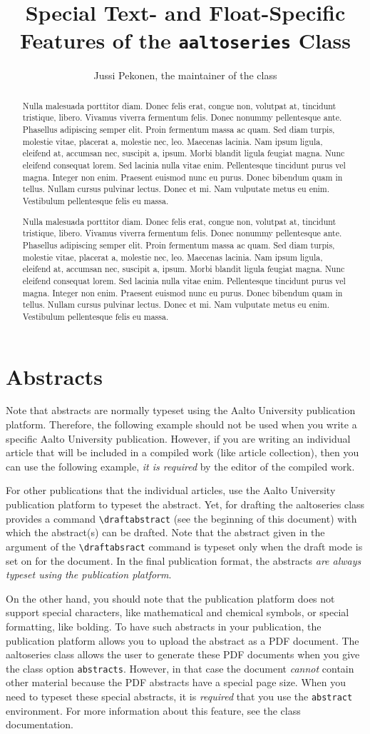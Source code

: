 \documentclass[draft*,nochapters]{aaltoseries}
\author{Jussi Pekonen, the maintainer of the class}
\title{Special Text- and Float-Specific Features of the \texttt{aaltoseries} Class}
\newcommand{\lipsum}{%
Nulla malesuada porttitor diam. Donec felis erat, congue non, volutpat at, tincidunt tristique, libero. Vivamus viverra fermentum felis. Donec nonummy pellentesque ante. Phasellus adipiscing semper elit. Proin fermentum massa ac quam. Sed diam turpis, molestie vitae, placerat a, molestie nec, leo. Maecenas lacinia. Nam ipsum ligula, eleifend at, accumsan nec, suscipit a, ipsum. Morbi blandit ligula feugiat magna. Nunc eleifend consequat lorem. Sed lacinia nulla vitae enim. Pellentesque tincidunt purus vel magna. Integer non enim. Praesent euismod nunc eu purus. Donec bibendum quam in tellus. Nullam cursus pulvinar lectus. Donec et mi. Nam vulputate metus eu enim. Vestibulum pellentesque felis eu massa.
}
\begin{document}

\tableofcontents

\clearpage

\section{Abstracts}

Note that abstracts are normally typeset using the Aalto University publication platform. Therefore, the following example should not be used when you write a specific Aalto University publication. However, if you are writing an individual article that will be included in a compiled work (like article collection), then you can use the following example, \emph{it is required} by the editor of the compiled work.

\begin{abstract}
\lipsum

\lipsum
\end{abstract}

\noindent%
For other publications that the individual articles, use the Aalto University publication platform to typeset the abstract. Yet, for drafting the \textsf{aaltoseries} class provides a command \texttt{\textbackslash draftabstract} (see the beginning of this document) with which the abstract(s) can be drafted. Note that the abstract given in the argument of the \texttt{\textbackslash draftabsract} command is typeset only when the draft mode is set on for the document. In the final publication format, the abstracts \emph{are always typeset using the publication platform}.

On the other hand, you should note that the publication platform does not support special characters, like mathematical and chemical symbols, or special formatting, like bolding. To have such abstracts in your publication, the publication platform allows you to upload the abstract as a PDF document. The \textsf{aaltoseries} class allows the user to generate these PDF documents when you give the class option \texttt{abstracts}. However, in that case the document \emph{cannot} contain other material because the PDF abstracts have a special page size. When you need to typeset these special abstracts, it is \emph{required} that you use the \texttt{abstract} environment. For more information about this feature, see the class documentation.
\end{document}
